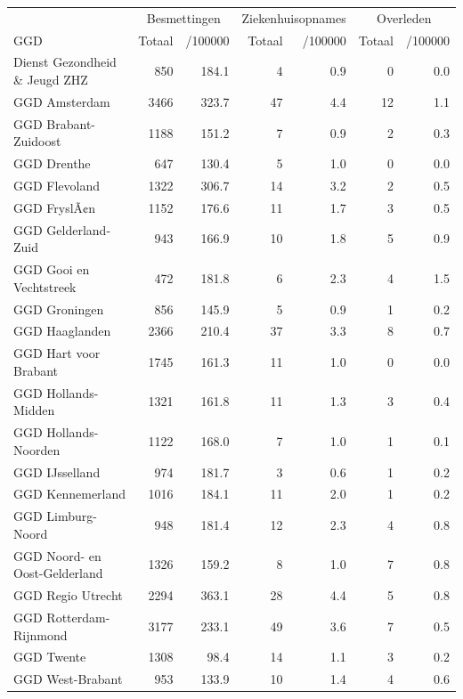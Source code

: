 \documentclass[
  english,
  man,floatsintext]{apa6}
\begin{document}
\begin{table}
\centering\begingroup\fontsize{10}{12}\selectfont

\begin{threeparttable}
\begin{tabular}{lrrrrrr}
\toprule
\multicolumn{1}{c}{ } & \multicolumn{2}{c}{Besmettingen} & \multicolumn{2}{c}{Ziekenhuisopnames} & \multicolumn{2}{c}{Overleden} \\
\cmidrule(l{3pt}r{3pt}){2-3} \cmidrule(l{3pt}r{3pt}){4-5} \cmidrule(l{3pt}r{3pt}){6-7}
GGD & Totaal & /100000 & Totaal & /100000 & Totaal & /100000\\
\midrule
Dienst Gezondheid \& Jeugd ZHZ & 850 & 184.1 & 4 & 0.9 & 0 & 0.0\\
GGD Amsterdam & 3466 & 323.7 & 47 & 4.4 & 12 & 1.1\\
GGD Brabant-Zuidoost & 1188 & 151.2 & 7 & 0.9 & 2 & 0.3\\
GGD Drenthe & 647 & 130.4 & 5 & 1.0 & 0 & 0.0\\
GGD Flevoland & 1322 & 306.7 & 14 & 3.2 & 2 & 0.5\\
GGD FryslÃ¢n & 1152 & 176.6 & 11 & 1.7 & 3 & 0.5\\
GGD Gelderland-Zuid & 943 & 166.9 & 10 & 1.8 & 5 & 0.9\\
GGD Gooi en Vechtstreek & 472 & 181.8 & 6 & 2.3 & 4 & 1.5\\
GGD Groningen & 856 & 145.9 & 5 & 0.9 & 1 & 0.2\\
GGD Haaglanden & 2366 & 210.4 & 37 & 3.3 & 8 & 0.7\\
GGD Hart voor Brabant & 1745 & 161.3 & 11 & 1.0 & 0 & 0.0\\
GGD Hollands-Midden & 1321 & 161.8 & 11 & 1.3 & 3 & 0.4\\
GGD Hollands-Noorden & 1122 & 168.0 & 7 & 1.0 & 1 & 0.1\\
GGD IJsselland & 974 & 181.7 & 3 & 0.6 & 1 & 0.2\\
GGD Kennemerland & 1016 & 184.1 & 11 & 2.0 & 1 & 0.2\\
GGD Limburg-Noord & 948 & 181.4 & 12 & 2.3 & 4 & 0.8\\
GGD Noord- en Oost-Gelderland & 1326 & 159.2 & 8 & 1.0 & 7 & 0.8\\
GGD Regio Utrecht & 2294 & 363.1 & 28 & 4.4 & 5 & 0.8\\
GGD Rotterdam-Rijnmond & 3177 & 233.1 & 49 & 3.6 & 7 & 0.5\\
GGD Twente & 1308 & 98.4 & 14 & 1.1 & 3 & 0.2\\
GGD West-Brabant & 953 & 133.9 & 10 & 1.4 & 4 & 0.6\\

\end{tabular}
\end{threeparttable}
\end{table}
\end{document}
